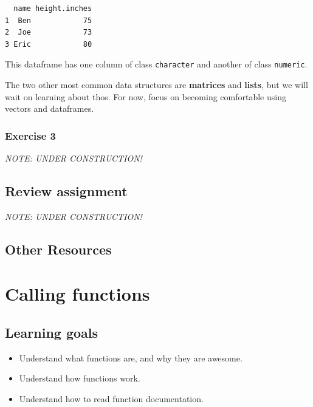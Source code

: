 \documentclass[
]{book}
\providecommand{\tightlist}{%
  \setlength{\itemsep}{0pt}\setlength{\parskip}{0pt}}
\begin{document}
\begin{verbatim}
  name height.inches
1  Ben            75
2  Joe            73
3 Eric            80
\end{verbatim}

This dataframe has one column of class \texttt{character} and another of class \texttt{numeric}.

The two other most common data structures are \textbf{matrices} and \textbf{lists}, but we will wait on learning about thos. For now, focus on becoming comfortable using vectors and dataframes.

\hypertarget{exercise-3-3}{%
\subsection*{Exercise 3}\label{exercise-3-3}}

\emph{NOTE: UNDER CONSTRUCTION!}

\hypertarget{review-assignment-3}{%
\section*{Review assignment}\label{review-assignment-3}}

\emph{NOTE: UNDER CONSTRUCTION!}

\hypertarget{other-resources-3}{%
\section*{Other Resources}\label{other-resources-3}}

\hypertarget{calling-functions}{%
\chapter{Calling functions}\label{calling-functions}}

\hypertarget{learning-goals-4}{%
\section*{Learning goals}\label{learning-goals-4}}

\begin{itemize}
\tightlist
\item
  Understand what functions are, and why they are awesome.
\item
  Understand how functions work.
\item
  Understand how to read function documentation.
\end{itemize}
\end{document}
